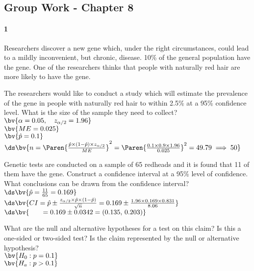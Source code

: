 \documentclass{article}
\begin{document}
\begin{flushleft}
\section*{Group Work - Chapter 8}
\paragraph{1} Researchers discover a new gene which, under the right circumstances, could lead to a mildly inconvenient, but chronic, disease. 10\% of the general population have the gene. One of the researchers thinks that people with naturally red hair are more likely to have the gene.
\begin{enumalpha}
\item The researchers would like to conduct a study which will estimate the prevalence of the gene in people with naturally red hair to within 2.5\% at a 95\% confidence level. What is the size of the sample they need to collect?\\
\medskip
$\bv{\alpha = 0.05, \quad z_{\alpha/2} = 1.96}$\\
$\bv{ME = 0.025}$\\
$\bv{\hat p = 0.1}$\\ \bigskip
$\ds \bv{n = \Paren{\frac{\hat p \times (1-\hat p) \times z_{\alpha/2}}{ME}}^2 = \Paren{\frac{0.1 \times 0.9 \times 1.96}{0.025}}^2 = 49.79 \implies 50}$
\vspace{0.5in}

\item Genetic tests are conducted on a sample of 65 redheads and it is found that 11 of them have the gene. Construct a confidence interval at a 95\% level of confidence. What conclusions can be drawn from the confidence interval?\\
\bigskip
$\ds\bv{\hat p = \frac{11}{65} = 0.169}$\\
\medskip
$\ds \bv{CI = \hat p \pm \frac{z_{\alpha/2} \times \hat p \times (1-\hat p)}{\sqrt{n} } = 0.169 \pm \frac{1.96 \times 0.169 \times 0.831}{8.06}}$\\ \medskip
$\ds\bv{\qquad = 0.169 \pm 0.0342 = (0.135, \, 0.203)}$\\
\bigskip
{}
\vspace{0.5in}

\item What are the null and alternative hypotheses for a test on this claim? Is this a one-sided or two-sided test? Is the claim represented by the null or alternative hypothesis?\\ \medskip
$\bv{H_0: p = 0.1}$\\
$\bv{H_a: p > 0.1}$\\
\\
\vspace{.5in}


\end{enumalpha}
\end{flushleft}
\end{document}
